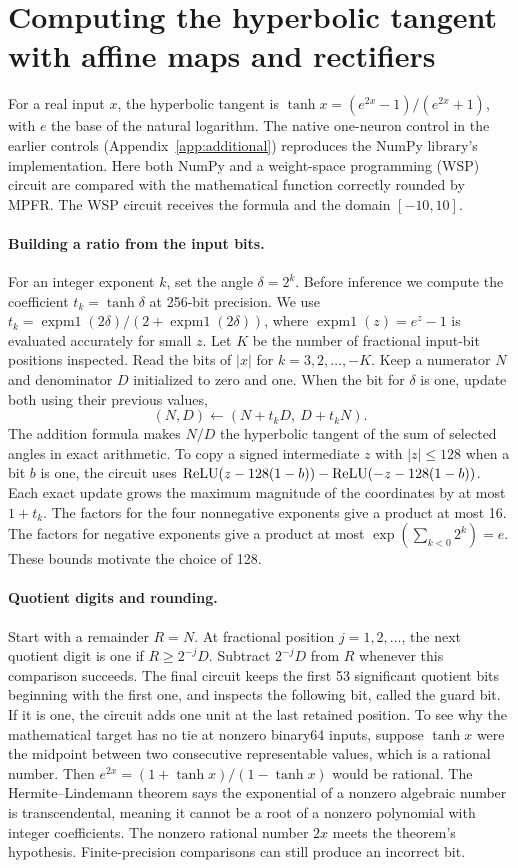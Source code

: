 \section{Computing the hyperbolic tangent with affine maps and rectifiers}
\label{app:relu-tanh}
For a real input $x$, the hyperbolic tangent is $\tanh x=(e^{2x}-1)/(e^{2x}+1)$, with $e$ the base of the natural logarithm. The native one-neuron control in the earlier controls (Appendix~\ref{app:additional}) reproduces the NumPy library's implementation. Here both NumPy and a weight-space programming (WSP) circuit are compared with the mathematical function correctly rounded by MPFR. The WSP circuit receives the formula and the domain $[-10,10]$.

\paragraph{Building a ratio from the input bits.}
For an integer exponent $k$, set the angle $\delta=2^k$. Before inference we compute the coefficient $t_k=\tanh\delta$ at 256-bit precision. We use $t_k=\operatorname{expm1}(2\delta)/(2+\operatorname{expm1}(2\delta))$, where $\operatorname{expm1}(z)=e^z-1$ is evaluated accurately for small $z$. Let $K$ be the number of fractional input-bit positions inspected. Read the bits of $|x|$ for $k=3,2,\ldots,-K$. Keep a numerator $N$ and denominator $D$ initialized to zero and one. When the bit for $\delta$ is one, update both using their previous values,
\[
             (N,D)\longleftarrow (N+t_kD,\ D+t_kN).
\]
The addition formula makes $N/D$ the hyperbolic tangent of the sum of selected angles in exact arithmetic. To copy a signed intermediate $z$ with $|z|\le128$ when a bit $b$ is one, the circuit uses $\operatorname{ReLU}(z-128(1-b))-\operatorname{ReLU}(-z-128(1-b))$. Each exact update grows the maximum magnitude of the coordinates by at most $1+t_k$. The factors for the four nonnegative exponents give a product at most 16. The factors for negative exponents give a product at most $\exp(\sum_{k<0}2^k)=e$. These bounds motivate the choice of 128.

\paragraph{Quotient digits and rounding.}
Start with a remainder $R=N$. At fractional position $j=1,2,\ldots$, the next quotient digit is one if $R\ge 2^{-j}D$. Subtract $2^{-j}D$ from $R$ whenever this comparison succeeds. The final circuit keeps the first 53 significant quotient bits beginning with the first one, and inspects the following bit, called the guard bit. If it is one, the circuit adds one unit at the last retained position. To see why the mathematical target has no tie at nonzero binary64 inputs, suppose $\tanh x$ were the midpoint between two consecutive representable values, which is a rational number. Then $e^{2x}=(1+\tanh x)/(1-\tanh x)$ would be rational. The Hermite--Lindemann theorem says the exponential of a nonzero algebraic number is transcendental, meaning it cannot be a root of a nonzero polynomial with integer coefficients. The nonzero rational number $2x$ meets the theorem's hypothesis. Finite-precision comparisons can still produce an incorrect bit.

